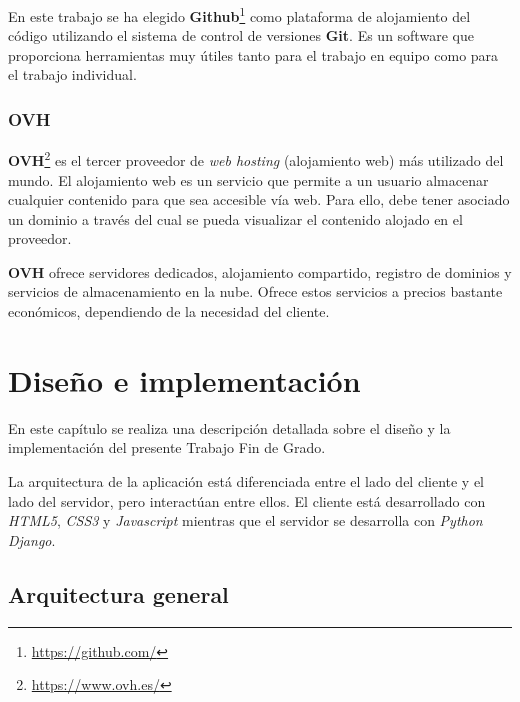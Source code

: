 \documentclass[a4paper, 12pt]{book}
\begin{document}
En este trabajo se ha elegido \textbf{Github}\footnote{\url{https://github.com/}} como plataforma de alojamiento del código utilizando el sistema de control de versiones \textbf{Git}. Es un software que proporciona herramientas muy útiles tanto para el trabajo en equipo como para el trabajo individual.

\subsection{OVH} 
\label{subsec:ovh}

\textbf{OVH}\footnote{\url{https://www.ovh.es/}} es el tercer proveedor de \textit{web hosting} (alojamiento web) más utilizado del mundo. El alojamiento web es un servicio que permite a un usuario almacenar cualquier contenido para que sea accesible vía web. Para ello, debe tener asociado un dominio a través del cual se pueda visualizar el contenido alojado en el proveedor.
\newline

\textbf{OVH} ofrece servidores dedicados, alojamiento compartido, registro de dominios y servicios de almacenamiento en la nube. Ofrece estos servicios a precios bastante económicos, dependiendo de la necesidad del cliente.



\cleardoublepage
\chapter{Diseño e implementación}

En este capítulo se realiza una descripción detallada sobre el diseño y la implementación del presente Trabajo Fin de Grado.
\newline

La arquitectura de la aplicación está diferenciada entre el lado del cliente y el lado del servidor, pero interactúan entre ellos. El cliente está desarrollado con \textit{HTML5}, \textit{CSS3} y \textit{Javascript} mientras que el servidor se desarrolla con \textit{Python Django}.


\section{Arquitectura general} 
\label{sec:arquitectura-general}
\end{document}
